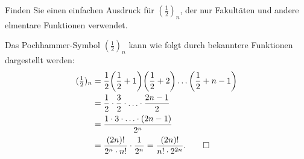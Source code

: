 Finden Sie einen einfachen Ausdruck für $(\frac12)_n$, der nur
Fakultäten und andere elmentare Funktionen verwendet.

\begin{loesung}
Das Pochhammer-Symbol $(\frac12)_n$ kann wie folgt durch bekanntere
Funktionen dargestellt werden:
\begin{align*}
({\textstyle\frac12})_n
&=
\frac12
\biggl(\frac12 + 1\biggr)
\biggl(\frac12 + 2\biggr)
\dots
\biggl(\frac12 + n-1\biggr)
\\
&=
\frac12\cdot
\frac32\cdot
\ldots
\cdot
\frac{2n-1}2
\\
&=
\frac{
1\cdot 3 \cdot\ldots\cdot (2n-1)
}{
2^n
}
\\
&=
\frac{(2n)!}{2^n\cdot n!}\cdot\frac{1}{2^n}
=
\frac{(2n)!}{n!\cdot 2^{2n}}.
\qedhere
\end{align*}
\end{loesung}
